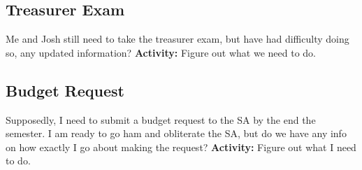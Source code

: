 \documentclass{article}
\begin{document}
\subsection{Treasurer Exam}
Me and Josh still need to take the treasurer exam, but have had difficulty doing so, any updated information? 
\newline\newline
\textbf{Activity:} Figure out what we need to do.

\subsection{Budget Request}
Supposedly, I need to submit a budget request to the SA by the end the semester. I am ready to go ham and obliterate the SA, but do we have any info on how exactly I go about making the request? 
\newline\newline
\textbf{Activity:} Figure out what I need to do.
\end{document}
